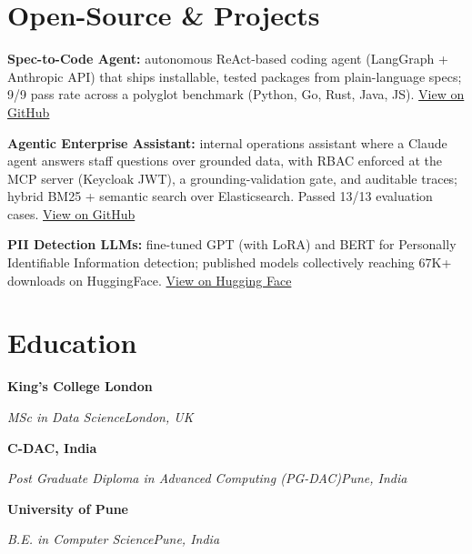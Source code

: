 \documentclass[10pt,a4paper]{article}
\newcommand{\entry}[4]{%
  {\color{company}\bfseries #1}\hfill {\color{muted}#2}\par
  \vspace{1pt}
  {\itshape #3}\hfill {\color{muted}\itshape #4}\par
  \vspace{3pt}%
}
\begin{document}
\section{Open-Source \& Projects}
\begin{tight}
  \item \textbf{Spec-to-Code Agent:} autonomous ReAct-based coding agent (LangGraph + Anthropic API) that ships installable, tested packages from plain-language specs; 9/9 pass rate across a polyglot benchmark (Python, Go, Rust, Java, JS). \href{https://github.com/abhijeetscode/Spec-to-Code-Agent}{View on GitHub}
  \item \textbf{Agentic Enterprise Assistant:} internal operations assistant where a Claude agent answers staff questions over grounded data, with RBAC enforced at the MCP server (Keycloak JWT), a grounding-validation gate, and auditable traces; hybrid BM25 + semantic search over Elasticsearch. Passed 13/13 evaluation cases. \href{https://github.com/abhijeetscode/Agentic-Enterprise-Assistant}{View on GitHub}
  \item \textbf{PII Detection LLMs:} fine-tuned GPT (with LoRA) and BERT for Personally Identifiable Information detection; published models collectively reaching 67K+ downloads on HuggingFace. \href{https://huggingface.co/ab-ai/pii_model}{View on Hugging Face}
\end{tight}

\section{Education}
\entry{King's College London}{}{MSc in Data Science}{London, UK}
\vspace{-3pt}
\entry{C-DAC, India}{}{Post Graduate Diploma in Advanced Computing (PG-DAC)}{Pune, India}
\vspace{-3pt}
\entry{University of Pune}{}{B.E. in Computer Science}{Pune, India}
\end{document}
